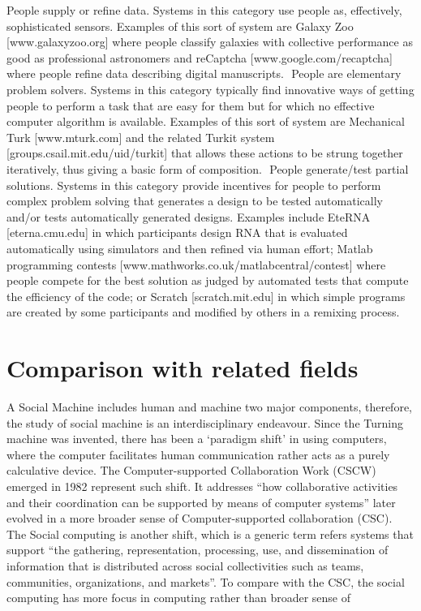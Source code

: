 \documentclass{sig-alternate}
\begin{document}
People  supply  or  refine  data.    Systems  in  this  category  use  people  as,  effectively,  sophisticated  sensors.
Examples of  this  sort of  system  are Galaxy  Zoo  [www.galaxyzoo.org] where people  classify  galaxies with
collective performance as good as professional astronomers and reCaptcha [www.google.com/recaptcha]
where people refine data describing digital manuscripts.
 People are elementary problem solvers. Systems in this category typically find innovative ways of getting
people to perform a task that are easy for them but for which no effective computer algorithm is available.
Examples  of  this  sort  of  system  are Mechanical  Turk  [www.mturk.com]  and  the  related  Turkit  system
[groups.csail.mit.edu/uid/turkit]  that  allows  these  actions  to  be  strung  together  iteratively,  thus  giving  a
basic form of composition.
 People generate/test partial  solutions. Systems  in  this  category provide  incentives  for people  to perform
complex  problem  solving  that  generates  a  design  to  be  tested  automatically  and/or  tests  automatically
generated  designs.    Examples  include  EteRNA  [eterna.cmu.edu]  in which  participants  design RNA  that  is
evaluated automatically using simulators and then refined via human effort; Matlab programming contests
[www.mathworks.co.uk/matlabcentral/contest] where people compete for the best solution as judged by automated  tests  that  compute  the  efficiency  of  the  code;  or  Scratch  [scratch.mit.edu]  in  which  simple programs are created by some participants and modified by others in a remixing process.


\section{Comparison with related fields}

A Social Machine includes human and machine two major components, therefore, the study of social machine is an interdisciplinary endeavour. Since the Turning machine was invented, there has been a `paradigm shift' in using computers, where the computer facilitates human communication rather acts as a purely calculative device. The Computer-supported Collaboration Work (CSCW) emerged in 1982 represent such shift. It addresses ``how collaborative activities and their coordination can be supported by means of computer systems'' later evolved in a more broader sense of  Computer-supported collaboration (CSC). The Social computing is another shift, which is a generic term refers systems that support ``the gathering, representation, processing, use, and dissemination of information that is distributed across social collectivities such as teams, communities, organizations, and markets''. To compare with the CSC, the social computing has more focus in computing rather than broader sense of 
\end{document}

